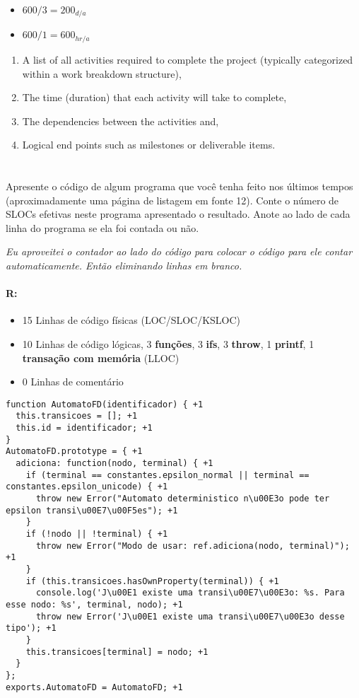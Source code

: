 \documentclass[10pt, a4paper]{report}
\begin{document}
\begin{itemize}
\item $600 / 3 = 200_{d/a}$
\item $600 / 1 = 600_{hr/a}$
\end{itemize}


\begin{enumerate}
\item A list of all activities required to complete the project (typically categorized within a work breakdown structure),
\item The time (duration) that each activity will take to complete,
\item The dependencies between the activities and,
\item Logical end points such as milestones or deliverable items.
\end{enumerate}

\section{}

\qquad Apresente o código de algum programa que você tenha feito nos últimos
tempos (aproximadamente uma página de listagem em fonte 12). Conte o número de
SLOCs efetivas neste programa apresentado o resultado. Anote ao lado de cada
linha do programa se ela foi contada ou não.

\textit{Eu aproveitei o contador ao lado do código para colocar o código para
ele contar automaticamente. Então eliminando linhas em branco.}

\paragraph{R:}

\begin{itemize}
\item 15 Linhas de código físicas (LOC/SLOC/KSLOC) \item 10 Linhas de código
lógicas, 3 \textbf{funções}, 3 \textbf{ifs}, 3 \textbf{throw}, 1
\textbf{printf}, 1 \textbf{transação com memória} (LLOC) \item 0 Linhas de
comentário
\end{itemize}

\begin{lstlisting}
function AutomatoFD(identificador) { +1
  this.transicoes = []; +1
  this.id = identificador; +1
}
AutomatoFD.prototype = { +1
  adiciona: function(nodo, terminal) { +1
    if (terminal == constantes.epsilon_normal || terminal == constantes.epsilon_unicode) { +1
      throw new Error("Automato deterministico n\u00E3o pode ter epsilon transi\u00E7\u00F5es"); +1
    }
    if (!nodo || !terminal) { +1
      throw new Error("Modo de usar: ref.adiciona(nodo, terminal)"); +1
    }
    if (this.transicoes.hasOwnProperty(terminal)) { +1
      console.log('J\u00E1 existe uma transi\u00E7\u00E3o: %s. Para esse nodo: %s', terminal, nodo); +1
      throw new Error('J\u00E1 existe uma transi\u00E7\u00E3o desse tipo'); +1
    }
    this.transicoes[terminal] = nodo; +1
  }
};
exports.AutomatoFD = AutomatoFD; +1
\end{lstlisting}
\end{document}
